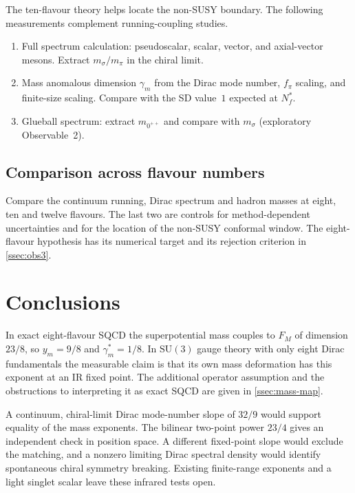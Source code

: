 \documentclass[11pt,a4paper]{article}
\theoremstyle{plain}
\theoremstyle{definition}
\theoremstyle{remark}
\newcommand{\Nf}{N_{\!f}}
\newcommand{\Nfstar}{\Nf^*}
\newcommand{\SU}[1]{\mathrm{SU}(#1)}
\begin{document}
The ten-flavour theory helps locate the non-SUSY boundary.  The
following measurements complement running-coupling studies.
\begin{enumerate}[label=(\alph*)]
  \item Full spectrum calculation: pseudoscalar, scalar, vector,
    and axial-vector mesons.  Extract $m_\sigma / m_\pi$ in the chiral
    limit.
  \item Mass anomalous dimension $\gamma_m$ from the Dirac mode number,
    $f_\pi$ scaling, and finite-size scaling.  Compare with the SD
    value~$1$ expected at $\Nfstar$.
  \item Glueball spectrum: extract $m_{0^{++}}$ and compare with
    $m_\sigma$ (exploratory Observable~2).
\end{enumerate}

\subsection{Comparison across flavour numbers}

Compare the continuum running, Dirac spectrum and hadron masses at
eight, ten and twelve flavours.  The last two are controls for
method-dependent uncertainties and for the location of the non-SUSY
conformal window.  The eight-flavour hypothesis has its numerical
target and its rejection criterion in \cref{ssec:obs3}.

\section{Conclusions}
\label{sec:conclusions}

In exact eight-flavour SQCD the superpotential mass couples to $F_M$
of dimension $23/8$, so
$y_m=9/8$ and $\gamma_m^*=1/8$.  In $\SU{3}$ gauge theory with only
eight Dirac fundamentals the measurable claim is that its own mass
deformation has this exponent at an IR fixed point.  The additional
operator assumption and the obstructions to interpreting it as exact
SQCD are given in \cref{ssec:mass-map}.

A continuum, chiral-limit Dirac mode-number slope of $32/9$ would
support equality of the mass exponents.  The bilinear two-point power
$23/4$ gives an independent check in position space.  A different
fixed-point slope would exclude the matching, and a nonzero limiting
Dirac spectral density would identify spontaneous chiral symmetry
breaking.  Existing finite-range exponents and a light singlet scalar
leave these infrared tests open.
\end{document}
